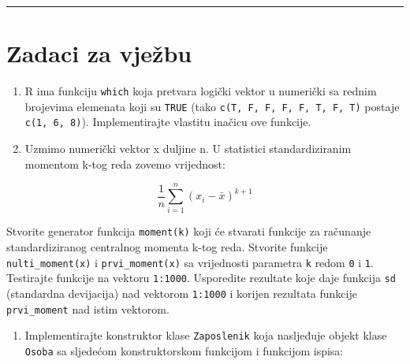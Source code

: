 \documentclass[]{book}
\newenvironment{Shaded}{\begin{snugshade}}{\end{snugshade}}
\newcommand{\KeywordTok}[1]{\textcolor[rgb]{0.13,0.29,0.53}{\textbf{#1}}}
\newcommand{\DataTypeTok}[1]{\textcolor[rgb]{0.13,0.29,0.53}{#1}}
\newcommand{\CharTok}[1]{\textcolor[rgb]{0.31,0.60,0.02}{#1}}
\newcommand{\StringTok}[1]{\textcolor[rgb]{0.31,0.60,0.02}{#1}}
\newcommand{\ControlFlowTok}[1]{\textcolor[rgb]{0.13,0.29,0.53}{\textbf{#1}}}
\newcommand{\OperatorTok}[1]{\textcolor[rgb]{0.81,0.36,0.00}{\textbf{#1}}}
\newcommand{\NormalTok}[1]{#1}
\providecommand{\tightlist}{%
  \setlength{\itemsep}{0pt}\setlength{\parskip}{0pt}}
\theoremstyle{definition}
\theoremstyle{definition}
\theoremstyle{definition}
\theoremstyle{remark}
\begin{document}
\begin{center}\rule{0.5\linewidth}{\linethickness}\end{center}

\section*{Zadaci za vježbu}\label{zadaci-za-vjezbu-5}

\begin{enumerate}
\def\labelenumi{\arabic{enumi}.}
\item
  R ima funkciju \texttt{which} koja pretvara logički vektor u numerički
  sa rednim brojevima elemenata koji su \texttt{TRUE} (tako
  \texttt{c(T,\ F,\ F,\ F,\ F,\ T,\ F,\ T)} postaje
  \texttt{c(1,\ 6,\ 8)}). Implementirajte vlastitu inačicu ove funkcije.
\item
  Uzmimo numerički vektor x duljine n. U statistici standardiziranim
  momentom k-tog reda zovemo vrijednost:
\end{enumerate}

\[\frac{1}{n}\sum_{i=1}^n{(x_i - \bar{x})}^{k+1}\]

Stvorite generator funkcija \texttt{moment(k)} koji će stvarati funkcije
za računanje standardiziranog centralnog momenta k-tog reda. Stvorite
funkcije \texttt{nulti\_moment(x)} i \texttt{prvi\_moment(x)} sa
vrijednosti parametra \texttt{k} redom \texttt{0} i \texttt{1}.
Testirajte funkcije na vektoru \texttt{1:1000}. Usporedite rezultate
koje daje funkcija \texttt{sd} (standardna devijacija) nad vektorom
\texttt{1:1000} i korijen rezultata funkcije \texttt{prvi\_moment} nad
istim vektorom.

\begin{enumerate}
\def\labelenumi{\arabic{enumi}.}
\setcounter{enumi}{2}
\tightlist
\item
  Implementirajte konstruktor klase \texttt{Zaposlenik} koja nasljeđuje
  objekt klase \texttt{Osoba} sa sljedećom konstruktorskom funkcijom i
  funkcijom ispisa:
\end{enumerate}

\begin{Shaded}
\end{Shaded}
\end{document}
